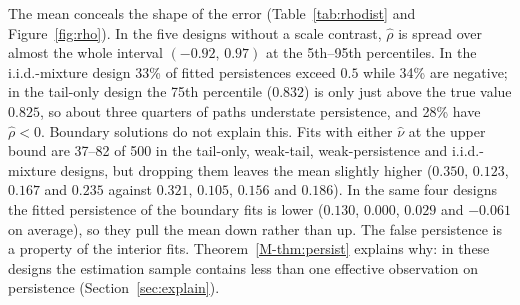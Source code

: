 \documentclass[11pt,a4paper]{article}
\theoremstyle{plain}
\theoremstyle{remark}
\begin{document}
The mean conceals the shape of the error (Table~\ref{tab:rhodist} and Figure~\ref{fig:rho}). In the five designs without a scale contrast, $\hat\rho$ is spread over almost the whole interval $(-0.92,\,0.97)$ at the 5th--95th percentiles. In the i.i.d.-mixture design 33\% of fitted persistences exceed $0.5$ while 34\% are negative; in the tail-only design the 75th percentile ($0.832$) is only just above the true value $0.825$, so about three quarters of paths understate persistence, and 28\% have $\hat\rho<0$. Boundary solutions do not explain this. Fits with either $\hat\nu$ at the upper bound are 37--82 of 500 in the tail-only, weak-tail, weak-persistence and i.i.d.-mixture designs, but dropping them leaves the mean slightly higher ($0.350$, $0.123$, $0.167$ and $0.235$ against $0.321$, $0.105$, $0.156$ and $0.186$). In the same four designs the fitted persistence of the boundary fits is lower ($0.130$, $0.000$, $0.029$ and $-0.061$ on average), so they pull the mean down rather than up. The false persistence is a property of the interior fits. Theorem~\ref{M-thm:persist} explains why: in these designs the estimation sample contains less than one effective observation on persistence (Section~\ref{sec:explain}).
\end{document}
